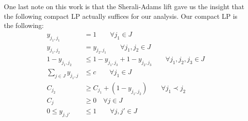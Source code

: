 One last note on this work is that the
Sherali-Adams lift gave us the insight that the following compact LP actually suffices for our analysis.
Our compact LP is the following: 
\begin{align*}
y_{j_1,j_1}&=1 \qquad \forall j_1 \in J\\
y_{j_1,j_2} &= y_{j_2,j_1} \qquad \forall j_1,j_2 \in J\\
1-y_{j_1,j_2} &\leq 1-y_{j_1,j_3} + 1-y_{j_2,j_3} \qquad \forall j_1,j_2,j_3 \in J\\
\sum_{j \in J} y_{j_1,j} &\leq c \qquad \forall j_1 \in J\\
 C_{j_2} &\geq C_{j_1} + (1-y_{j_1,j_2}) \qquad \forall j_1 \prec j_2 \\
  C_j &\geq 0 \quad \forall j \in J \\
  0 \leq y_{j,j'} &\leq 1 \qquad \forall j,j' \in J
\end{align*}








